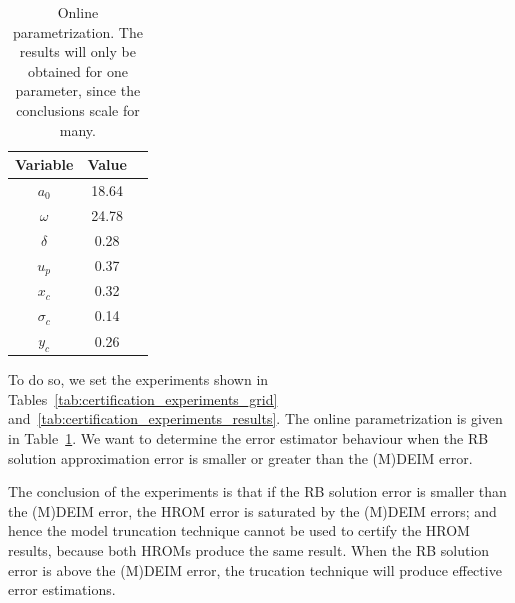 \documentclass[../../thesis.tex]{subfiles}
\begin{document}
\begin{table}[h]
    \centering
    \caption{Online parametrization.
    The results will only be obtained for one parameter,
    since the conclusions scale for many.}
    \begin{tabular}{ccc}
    \toprule
        Variable   & Value  \\ 
        \midrule
        $a_0$      & 18.64   \\
        $\omega$   & 24.78   \\
        $\delta$   & 0.28    \\
        $u_p$      & 0.37    \\
        \midrule
        $x_c$      & 0.32    \\
        $\sigma_c$ & 0.14    \\
        $y_c$      & 0.26    \\ 
        \bottomrule
    \end{tabular}
    \label{tab:parameters_online_arbitrary}
\end{table}
To do so, we set the experiments shown in 
Tables~\ref{tab:certification_experiments_grid} 
and~\ref{tab:certification_experiments_results}.
The online parametrization is given in Table~\ref{tab:parameters_online_arbitrary}.
We want to determine the error estimator behaviour when 
the RB solution approximation error is smaller or greater than the (M)DEIM error.

The conclusion of the experiments is that if the RB solution error is smaller than the (M)DEIM error,
the HROM error is saturated by the (M)DEIM errors;
and hence the model truncation technique cannot be used to certify the HROM results,
because both HROMs produce the same result.
When the RB solution error is above the (M)DEIM error, the trucation technique 
will produce effective error estimations.
\end{document}
